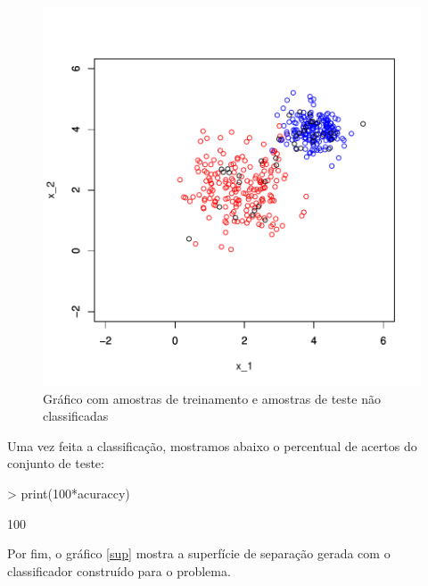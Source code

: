 \documentclass[12pt]{article}
\begin{document}
\begin{figure}
\centering
\includegraphics{BayesClassifier-006}
\caption{Gráfico com amostras de treinamento e amostras de teste não classificadas}
\label{tre_tst}
\end{figure}

\par Uma vez feita a classificação, mostramos abaixo o percentual de acertos do conjunto de teste:
\begin{Schunk}
\begin{Sinput}
> print(100*acuraccy)
\end{Sinput}
\begin{Soutput}
[1] 100
\end{Soutput}
\end{Schunk}

\par Por fim, o gráfico \ref{sup} mostra a superfície de separação gerada com o classificador construído para o problema.
\end{document}
